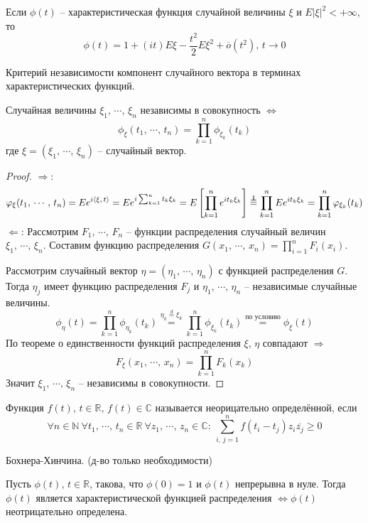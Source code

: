 \begin{corollary}
	Если $\phi(t)$ -- характеристическая функция случайной величины $\xi$ и $E|\xi|^2 < +\infty$, то
	\[\phi(t) = 1 + (it)E\xi - \frac{t^2}{2}E\xi^2 + \overline{o}(t^2),\, t \to 0\]
\end{corollary}

\begin{theorem}
	Критерий независимости компонент случайного вектора в терминах характеристических функций.

	Случайная величины $\xi_1,\,\cdots,\,\xi_n$ независимы в совокупность $\Leftrightarrow$
	\[\phi_\xi(t_1,\,\cdots,\,t_n) = \prod_{k = 1}^n \phi_{\xi_k}(t_k)\]
	где $\xi = (\xi_1,\,\cdots,\,\xi_n)$ -- случайный вектор.
\end{theorem}

\begin{proof}
	$\Rightarrow$:
	\[
		\phi_\xi(t_1,\,\cdots,\,t_n) = Ee^{i\langle\xi,\, t\rangle} = Ee^{i\sum_{k = 1}^n t_k\xi_k} = E\left[\prod_{k = 1}^n e^{it_k\xi_k}\right] \stackrel{\independent}{=} \prod_{k = 1}^n Ee^{it_k\xi_k} = \prod_{k = 1}^n \phi_{\xi_k}(t_k)
	\]
  $\Leftarrow$: Рассмотрим $F_1,\,\cdots,\,F_n$ -- функции распределения случайный величин $\xi_1,\,\cdots,\,\xi_n$. Составим функцию распределения $G(x_1,\,\cdots,\,x_n) = \prod_{i = 1}^nF_i(x_i)$. 
  
  Рассмотрим случайный вектор $\eta = (\eta_1,\,\cdots,\,\eta_n)$ с функцией распределения $G$. Тогда $\eta_j$ имеет функцию распределения $F_j$ и $\eta_1,\,\cdots,\,\eta_n$ -- независимые случайные величины.
  \[\phi_\eta(t) = \prod_{k = 1}^n \phi_{\eta_k}(t_k) \stackrel{\eta_k \stackrel{d}{=} \xi_k}{=} \prod_{k = 1}^n \phi_{\xi_k}(t_k) \stackrel{\text{по условию}}{=} \phi_\xi(t)\]
  По теореме о единственности функций распределения $\xi,\, \eta$ совпадают $\Rightarrow$
  \[F_\xi(x_1,\,\cdots,\,x_n) = \prod_{k = 1}^n F_k(x_k)\]
  Значит $\xi_1,\,\cdots,\,\xi_n$ -- независимы в совокупности. 
\end{proof}

\begin{definition}
  Функция $f(t),\, t \in \mathbb{R},\, f(t) \in \mathbb{C}$ называется неорицательно определённой, если
  \[\forall n \in \mathbb{N} \: \forall t_1,\,\cdots,\,t_n \in \mathbb{R} \: \forall z_1,\,\cdots,\,z_n \in \mathbb{C} :\: \sum_{i,\,j = 1}^n f(t_i - t_j)z_i\overline{z_j} \geq 0\]
\end{definition}

\begin{theorem}
  Бохнера-Хинчина. (д-во только необходимости)

  Пусть $\phi(t),\, t \in \mathbb{R}$, такова, что $\phi(0) = 1$ и $\phi(t)$ непрерывна в нуле. Тогда $\phi(t)$ является характеристической функцией распределения $\Leftrightarrow \phi(t)$ неотрицательно определена.
\end{theorem}

